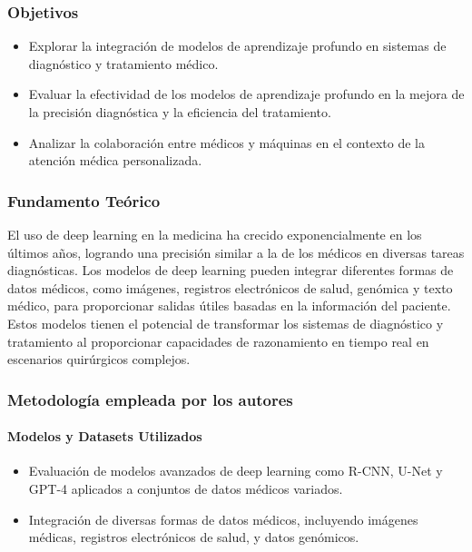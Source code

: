 \subsubsection{Objetivos}

\begin{itemize}
    \item Explorar la integración de modelos de aprendizaje profundo en sistemas de diagnóstico y tratamiento médico.
    \item Evaluar la efectividad de los modelos de aprendizaje profundo en la mejora de la precisión diagnóstica y la eficiencia del tratamiento.
    \item Analizar la colaboración entre médicos y máquinas en el contexto de la atención médica personalizada.
\end{itemize}

\subsubsection{Fundamento Teórico}

El uso de deep learning en la medicina ha crecido exponencialmente en los últimos años, logrando una precisión similar a la de los médicos en diversas tareas diagnósticas. Los modelos de deep learning pueden integrar diferentes formas de datos médicos, como imágenes, registros electrónicos de salud, genómica y texto médico, para proporcionar salidas útiles basadas en la información del paciente. Estos modelos tienen el potencial de transformar los sistemas de diagnóstico y tratamiento al proporcionar capacidades de razonamiento en tiempo real en escenarios quirúrgicos complejos.


\subsubsection{Metodología empleada por los autores}

\paragraph{Modelos y Datasets Utilizados}

\begin{itemize}
    \item Evaluación de modelos avanzados de deep learning como R-CNN, U-Net y GPT-4 aplicados a conjuntos de datos médicos variados.
    \item Integración de diversas formas de datos médicos, incluyendo imágenes médicas, registros electrónicos de salud, y datos genómicos.
\end{itemize}

